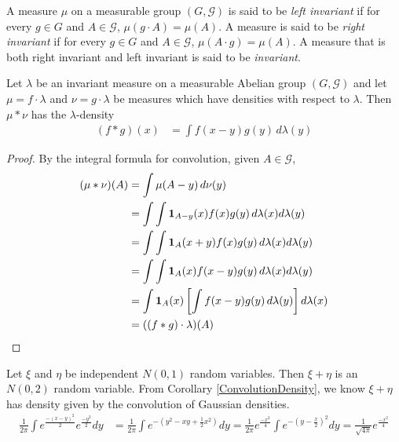 \begin{defn}A measure $\mu$ on a measurable group
  $(G, \mathcal{G})$ is said to be \emph{left invariant} if for every
  $g \in G$ and $A \in \mathcal{G}$, $\mu(g\cdot A) = \mu(A)$.  A
  measure is said to be \emph{right invariant} if for every
  $g \in G$ and $A \in \mathcal{G}$, $\mu(A\cdot g) = \mu(A)$.  A
  measure that is both right invariant and left invariant is said to
  be \emph{invariant}.
\end{defn}
\begin{lem}\label{ConvolutionDensity}Let $\lambda$ be an invariant measure on a measurable Abelian group
  $(G, \mathcal{G})$ and let $\mu = f \cdot \lambda$ and $\nu = g
  \cdot \lambda$ be measures which have densities with respect to
  $\lambda$.  Then $\mu * \nu$ has the $\lambda$-density
\begin{align*}
(f * g)(x) &= \int f(x-y) g(y) \, d\lambda(y)
\end{align*}
\end{lem}
\begin{proof}
By the integral formula for convolution, given $A \in \mathcal{G}$,
\begin{align*}
(\mu * \nu)(A) &= \int \mu(A - y) \, d \nu(y) \\
&= \int \int\textbf{1}_{A - y}(x) f(x) g(y) \, d\lambda(x)
d\lambda(y) \\
&= \int \int\textbf{1}_{A}(x+y) f(x) g(y) \, d\lambda(x)
d\lambda(y) \\
&= \int \int\textbf{1}_{A}(x) f(x-y) g(y) \, d\lambda(x)
d\lambda(y) \\
&= \int \textbf{1}_{A}(x) \left [ \int f(x-y) g(y) \, d\lambda(y)
  \right ] d\lambda(x) \\
&= ((f*g) \cdot \lambda)(A)
\end{align*}
\end{proof}
\begin{examp}Let $\xi$ and $\eta$ be independent $N(0,1)$ random
  variables.  Then $\xi + \eta$ is an $N(0,2)$ random variable.  From
  Corollary \ref{ConvolutionDensity}, we
  know $\xi + \eta$ has density given by the convolution of Gaussian
  densities.
\begin{align*}
\frac{1}{2\pi} \int e^\frac{-(x-y)^2}{2} e^\frac{-y^2}{2} dy &=
\frac{1}{2\pi} \int e^{-(y^2 -xy + \frac{1}{2}x^2)} dy =
\frac{1}{2\pi} e^\frac{-x^2}{4} \int e^{-(y - \frac{x}{2})^2} dy =
\frac{1}{\sqrt{4\pi}} e^\frac{-x^2}{4}
\end{align*}
\end{examp}

